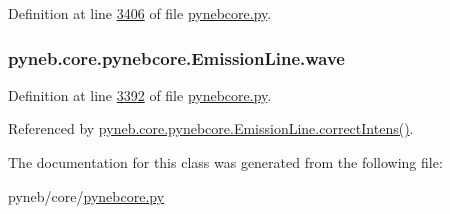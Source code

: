 Definition at line \hyperlink{pynebcore_8py_source_l03406}{3406} of file \hyperlink{pynebcore_8py_source}{pynebcore.\-py}.

\hypertarget{classpyneb_1_1core_1_1pynebcore_1_1_emission_line_a32755b006f794c0759c7b7da330b2dc1}{
\subsubsection[{wave}]{\setlength{\rightskip}{0pt plus 5cm}pyneb.\-core.\-pynebcore.\-Emission\-Line.\-wave}}\label{classpyneb_1_1core_1_1pynebcore_1_1_emission_line_a32755b006f794c0759c7b7da330b2dc1}


Definition at line \hyperlink{pynebcore_8py_source_l03392}{3392} of file \hyperlink{pynebcore_8py_source}{pynebcore.\-py}.



Referenced by \hyperlink{pynebcore_8py_source_l03447}{pyneb.\-core.\-pynebcore.\-Emission\-Line.\-correct\-Intens()}.



The documentation for this class was generated from the following file\-:\begin{DoxyCompactItemize}
\item 
pyneb/core/\hyperlink{pynebcore_8py}{pynebcore.\-py}\end{DoxyCompactItemize}
